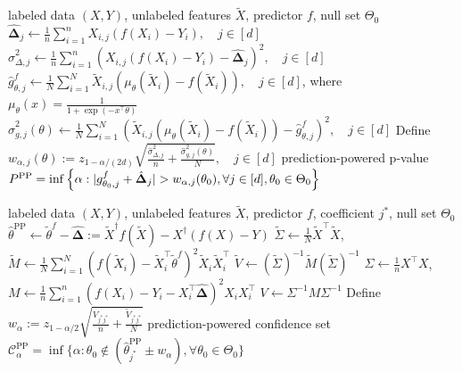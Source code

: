 \documentclass[10pt]{article}
\newcommand{\Xa}{X}
\newcommand{\Xt}{\widetilde{X}}
\newcommand{\Ya}{Y}
\newcommand{\thetaf}{\tilde{\theta}^{f}}
\newcommand{\thetaPP}{\hat{\theta}^{\mathrm{PP}}}
\newcommand{\rechat}{\hat{\mathbf{\Delta}}}
\newcommand{\CPP}{\mathcal{C}^{\mathrm{PP}}}
\begin{document}
\vspace{-.3cm}

\begin{algorithm}[H]
\caption{Prediction-powered p-value for logistic regression coefficients}
\label{alg:logistic_pval}
\begin{algorithmic}[1]
\Require labeled data $(\Xa, \Ya)$, unlabeled features $\Xt$, predictor $f$, null set $\Theta_0$
\State $\rechat_j \leftarrow \frac{1}{n}\sum_{i=1}^n X_{i,j}(f(X_i) - Y_i), \quad j\in[d]$ 
\State $\hat \sigma_{\Delta,j}^2 \leftarrow \frac{1}{n}\sum_{i=1}^n\left(X_{i,j}(f(X_i) - Y_i) - \rechat_j\right)^2, \quad j\in[d]$ 
\State $\hat g^f_{\theta,j} \leftarrow \frac{1}{N}\sum_{i=1}^N \Xt_{i,j}\left(\mu_\theta(\Xt_i) - f(\Xt_i) \right), \quad j\in [d]$, \quad where $\mu_\theta(x) = \frac{1}{1+\exp(-x^\top \theta)}$
\State $\hat \sigma_{g,j}^2(\theta) \leftarrow \frac{1}{N}\sum_{i=1}^N\left(\Xt_{i,j}(\mu_\theta(\Xt_i) - f(\Xt_i)) - \hat g^f_{\theta,j}\right)^2, \quad j\in[d]$ 
\State Define $w_{\alpha,j}(\theta) := z_{1-\alpha/(2d)} \sqrt{ \frac{\hat\sigma_{\Delta,j}^2}{n} +  \frac{\hat \sigma_{g,j}^2(\theta)}{N}}, \quad j\in[d]$
\EndFor
\Ensure 
prediction-powered p-value $P^{\rm PP} = \inf\left\{\alpha:  |g^f_{\theta_0,j} + \rechat_j| > w_{\alpha,j}(\theta_0), \forall j\in[d], \theta_0 \in \Theta_0 \right\}$
\end{algorithmic}
\end{algorithm}

\vspace{-.3cm}

\begin{algorithm}[H]
\caption{Prediction-powered p-value for linear regression coefficients}
\label{alg:ols_pval}
\begin{algorithmic}[1]
\Require labeled data $(X, Y)$, unlabeled features $\Xt$, predictor $f$, coefficient $j^*$, null set $\Theta_0$
\State $\thetaPP \leftarrow \thetaf - \rechat := \Xt^\dagger f(\Xt) - X^\dagger (f(X) - Y)$
\State $\tilde \Sigma \leftarrow \frac 1 N \Xt^\top \Xt$, $\tilde M \leftarrow \frac 1 N \sum_{i=1}^N (f(\Xt_i) - \Xt_i^\top  \thetaf)^2 \Xt_i \Xt_i^\top$
\State $\tilde V \leftarrow (\tilde \Sigma)^{-1} \tilde M (\tilde \Sigma)^{-1}$
\State $\Sigma \leftarrow \frac 1 n X^\top X$,  $M\leftarrow \frac 1 n \sum_{i=1}^n (f(X_i) - Y_i - X_i^\top  \rechat)^2 X_i X_i^\top$
\State $V \leftarrow \Sigma^{-1} M  \Sigma^{-1}$
\State Define $w_{\alpha} := z_{1-\alpha/2} \sqrt{ \frac{ V_{j^*j^*}}{n} + \frac{ \tilde V_{j^*j^*}}{N}}$
\Ensure 
prediction-powered confidence set $\CPP_\alpha = \inf\{\alpha: \theta_0\not\in (\thetaPP_{j^*} \pm w_{\alpha}),\forall \theta_0\in\Theta_0 \}$
\end{algorithmic}
\end{algorithm}
\end{document}
